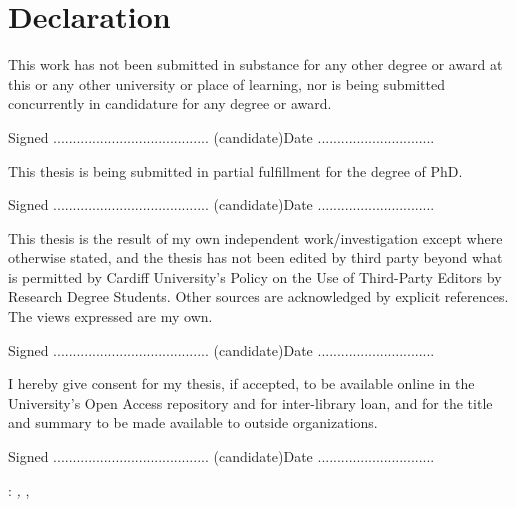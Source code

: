 \chapter*{Declaration}

\noindent
This work has not been submitted in substance for any other degree or award at this or any other university or place of learning, nor is being submitted concurrently in candidature for any degree or award.

\bigskip

\noindent
Signed ........................................ (candidate)\hfill Date ..............................

\vfill

\begingroup
\color{CTtitle}
\noindent{}
\endgroup

\noindent
This thesis is being submitted in partial fulfillment for the degree of PhD.

\bigskip

\noindent
Signed ........................................ (candidate)\hfill Date ..............................

\vfill

\begingroup
\color{CTtitle}
\noindent{}
\endgroup

\noindent
This thesis is the result of my own independent work/investigation except where otherwise stated, and the thesis has not been edited by third party beyond what is permitted by Cardiff University's Policy on the Use of Third-Party Editors by Research Degree Students. Other sources are acknowledged by explicit references. The views expressed are my own.

\bigskip

\noindent
Signed ........................................ (candidate)\hfill Date ..............................

\vfill

\begingroup
\color{CTtitle}
\noindent{}
\endgroup

\noindent
I hereby give consent for my thesis, if accepted, to be available online in the University's Open Access repository and for inter-library loan, and for the title and summary to be made available to outside organizations.

\bigskip

\noindent
Signed ........................................ (candidate)\hfill Date ..............................

\medskip

\vfill

\noindent\myName: \textit{\myTitle,}
\mySubtitle, %
\textcopyright\ \myTime

%
%
%
%
%
